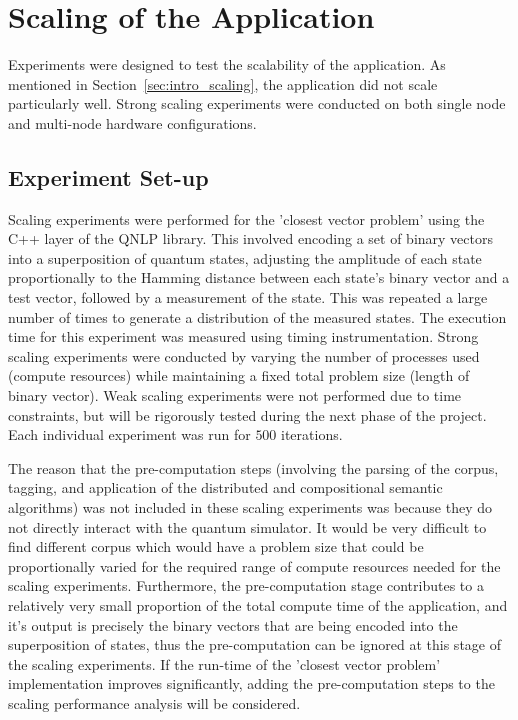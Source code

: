\section{Scaling of the Application}
\label{sec:Scaling_of_the_Application}
 Experiments were designed to test the scalability of the application. As mentioned in Section~\ref{sec:intro_scaling}, the application did not scale particularly well. Strong scaling experiments were conducted on both single node and multi-node hardware configurations.


\subsection{Experiment Set-up}
Scaling experiments were performed for the 'closest vector problem' using the C++ layer of the QNLP library. This involved encoding a set of binary vectors into a superposition of quantum states, adjusting the amplitude of each state proportionally to the Hamming distance between each state's binary vector and a test vector, followed by a measurement of the state. This was repeated a large number of times to generate a distribution of the measured states. The execution time for this experiment was measured using timing instrumentation. Strong scaling experiments were conducted by varying the number of processes used (compute resources) while maintaining a fixed total problem size (length of binary vector). Weak scaling experiments were not performed due to time constraints, but will be rigorously tested during the next phase of the project. Each individual experiment was run for $500$ iterations.

The reason that the pre-computation steps (involving the parsing of the corpus, tagging, and application of the distributed and compositional semantic algorithms) was not included in these scaling experiments was because they do not directly interact with the quantum simulator. It would be very difficult to find different corpus which would have a problem size that could be proportionally varied for the required range of compute resources needed for the scaling experiments. Furthermore, the pre-computation stage contributes to a relatively very small proportion of the total compute time of the application, and it's output is precisely the binary vectors that are being encoded into the superposition of states, thus the pre-computation can be ignored at this stage of the scaling experiments. If the run-time of the 'closest vector problem' implementation improves significantly, adding the pre-computation steps to the scaling performance analysis will be considered.

